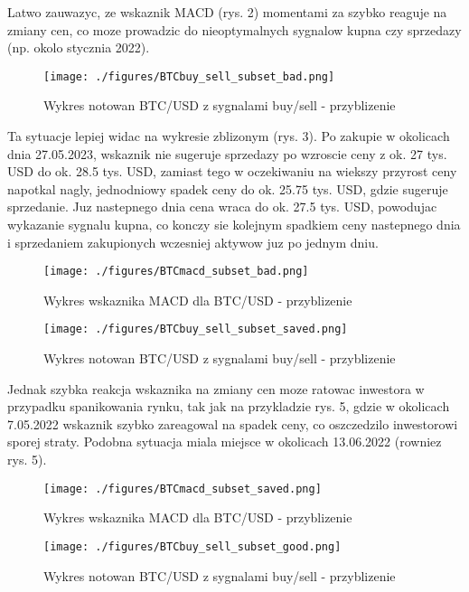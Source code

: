 \documentclass[a4paper,12pt]{article}  %
\begin{document}
Latwo zauwazyc, ze wskaznik MACD (rys. 2) momentami za szybko reaguje na zmiany
cen, co moze prowadzic do nieoptymalnych sygnalow kupna czy sprzedazy (np. okolo
stycznia 2022). 

\begin{figure}[H]
  \centering
  \texttt{[image: ./figures/BTCbuy\_sell\_subset\_bad.png]}
  \caption{Wykres notowan BTC/USD z sygnalami buy/sell - przyblizenie}
\end{figure}

Ta sytuacje lepiej widac na wykresie zblizonym (rys. 3). Po zakupie w okolicach 
dnia 27.05.2023, wskaznik nie sugeruje sprzedazy po wzroscie ceny z ok. 27 tys.
USD do ok. 28.5 tys. USD, zamiast tego w oczekiwaniu na wiekszy przyrost ceny
napotkal nagly, jednodniowy spadek ceny do ok. 25.75 tys. USD, gdzie sugeruje
sprzedanie. Juz nastepnego dnia cena wraca do ok. 27.5 tys. USD, powodujac
wykazanie sygnalu kupna, co konczy sie kolejnym spadkiem ceny nastepnego dnia i
sprzedaniem zakupionych wczesniej aktywow juz po jednym dniu.

\begin{figure}[H]
  \centering
  \texttt{[image: ./figures/BTCmacd\_subset\_bad.png]}
  \caption{Wykres wskaznika MACD dla BTC/USD - przyblizenie}
\end{figure}

\pagebreak

\begin{figure}[H]
  \centering
  \texttt{[image: ./figures/BTCbuy\_sell\_subset\_saved.png]}
  \caption{Wykres notowan BTC/USD z sygnalami buy/sell - przyblizenie}
\end{figure}


Jednak szybka reakcja wskaznika na zmiany cen moze ratowac inwestora w przypadku
spanikowania rynku, tak jak na przykladzie rys. 5, gdzie w okolicach 7.05.2022
wskaznik szybko zareagowal na spadek ceny, co oszczedzilo inwestorowi sporej
straty. Podobna sytuacja miala miejsce w okolicach 13.06.2022 (rowniez rys. 5).


\begin{figure}[H]
  \centering
  \texttt{[image: ./figures/BTCmacd\_subset\_saved.png]}
  \caption{Wykres wskaznika MACD dla BTC/USD - przyblizenie}
\end{figure}

\pagebreak

\begin{figure}[H]
  \centering
  \texttt{[image: ./figures/BTCbuy\_sell\_subset\_good.png]}
  \caption{Wykres notowan BTC/USD z sygnalami buy/sell - przyblizenie}
\end{figure}
\end{document}
